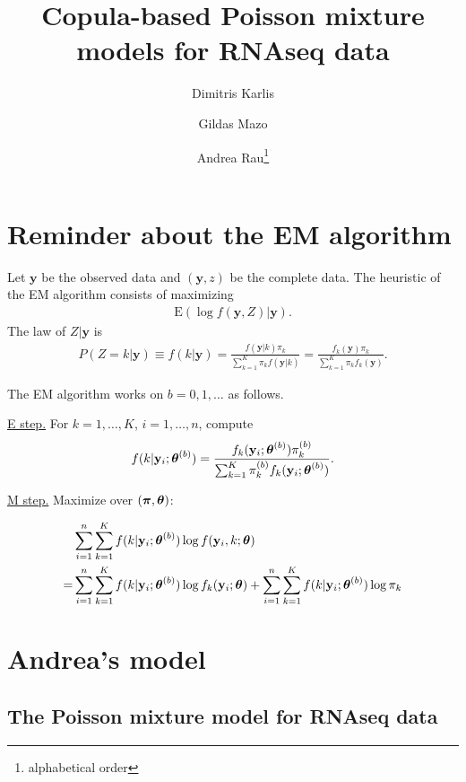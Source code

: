 \documentclass[10pt,oneside]{article}
\title{Copula-based Poisson mixture models for RNAseq data}
\author{Dimitris Karlis \and Gildas Mazo \and Andrea Rau\footnote{alphabetical order}}
\date{}
\newcommand\bfm[1]{\ensuremath\boldsymbol{#1}}
\newcommand\y{\mathbf{y}}
\newcommand\THETA{\bfm{\theta}}
\newcommand\PI{\bfm{\pi}}
\renewcommand{\b}{{(b)}}
\newcommand{\expec}{\text{E}}
\begin{document}
%

\maketitle

\section{Reminder about the EM algorithm}

Let $\y$ be the observed data and $(\y,z)$ be the complete data. The heuristic of the EM algorithm consists of maximizing
\begin{align*}
  \expec\left(\log f(\y,Z)\vert \y\right).
\end{align*}
The law of $Z\vert\y$ is
\begin{align*}
  P(Z=k\vert \y)\equiv f(k\vert\y)=
  \frac{f(\y\vert k)\pi_k}{\sum_{k=1}^K\pi_kf(\y\vert k)}=
  \frac{f_k(\y)\pi_k}{\sum_{k=1}^K\pi_kf_k(\y)}.
\end{align*}

The EM algorithm works on $b=0,1,\dots$ as follows.

\medskip

\noindent \underline{E step.} For $k=1,\dots,K$, $i=1,\dots,n$, compute
\begin{align*}
  f(k\vert\y_i;\THETA^\b)=
  \frac{f_k(\y_i;\THETA^\b)\pi_k^\b}{
  \sum_{k=1}^K\pi_k^\b f_k(\y_i;\THETA^\b)}.
\end{align*}

\medskip

\noindent \underline{M step.} Maximize over $(\PI,\THETA)$:

\begin{align}\label{eq:em-algo-standard}
  &\sum_{i=1}^n\sum_{k=1}^Kf(k\vert\y_i;\THETA^\b) \notag
  \log f(\y_i,k;\THETA)\\
  =&\sum_{i=1}^n\sum_{k=1}^Kf(k\vert\y_i;\THETA^\b)
     \log f_k(\y_i;\THETA) +
     \sum_{i=1}^n\sum_{k=1}^Kf(k\vert\y_i;\THETA^\b) \log \pi_k \notag
\end{align}

\section{Andrea's model} 

\subsection{The Poisson mixture model for RNAseq data}
\end{document}
